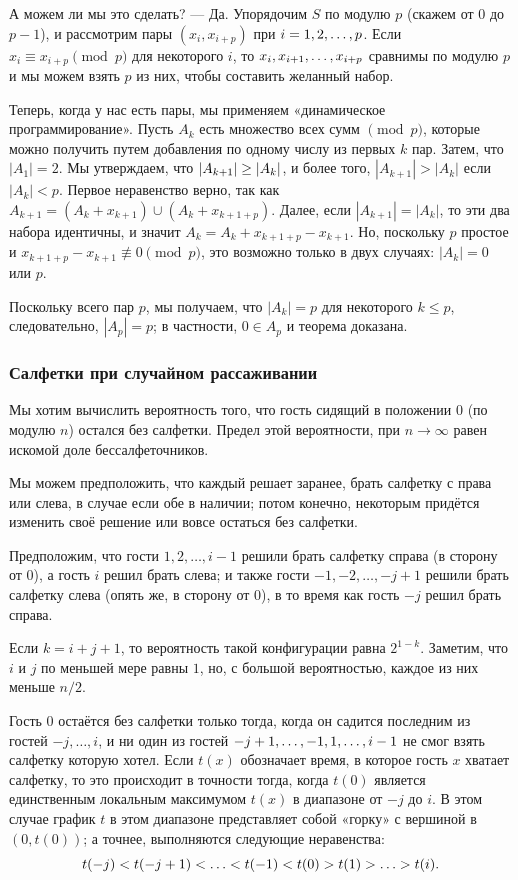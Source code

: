 А можем ли мы это сделать? --- Да.
Упорядочим $S$ по модулю $p$ (скажем от $0$ до $p-1$), и рассмотрим пары $(x_i,x_{i+p})$ при $i\z=1,2,\dots, p$.
Если $x_i\equiv x_{i+p}\pmod p$ для некоторого $i$, то $x_i,x_{i+1},\z\dots,x_{i+p}$ сравнимы по модулю $p$ и мы можем взять $p$ из них, чтобы составить желанный набор.

Теперь, когда у нас есть пары, мы применяем «динамическое программирование».
Пусть $A_k$ есть множество всех сумм $\pmod p$, которые можно получить путем добавления по одному числу из первых $k$ пар.
Затем, что $|A_1|= 2$.
Мы утверждаем, что $|A_{k+1}|\z\ge|A_k|$, и более того, $|A_{k+1}|>|A_k|$ если $|A_k|< p$.
Первое неравенство верно, так как $A_{k+1} = (A_k+x_{k+1}) \cup (A_k+x_{k+1+p})$.
Далее, если $|A_{k+1}|=|A_k|$, то эти два набора идентичны, и значит  $A_k = A_k+x_{k+1+p}-x_{k+1}$.
Но, поскольку $p$ простое и $x_{k+1+p}-x_{k+1}\not\equiv 0\pmod p$, это возможно только в двух случаях: $|A_k|= 0$ или $p$.

Поскольку всего пар $p$, мы получаем, что $|A_k|= p$ для некоторого $k \le p$, следовательно, $|A_p|= p$; в частности, $0\in A_p$ и теорема доказана. \heart

\subsubsection*{Салфетки при случайном рассаживании}

Мы хотим вычислить вероятность того, что гость сидящий в положении 0 (по модулю $n$) остался без салфетки.
Предел этой вероятности, при $n\to\infty$ равен искомой доле бессалфеточников.

Мы можем предположить, что каждый решает заранее, брать салфетку с права или слева, в случае если обе в наличии;
потом конечно, некоторым придётся изменить своё решение или вовсе остаться без салфетки.

Предположим, что гости $1,2,\dots, i - 1$ решили брать салфетку справа  (в сторону от 0), а гость $i$ решил брать слева;
и также гости $-1,-2,\dots, -j + 1$ решили брать салфетку слева (опять же, в сторону от 0), в то время как гость $-j$ решил брать справа.

Если $k = i+j+1$, то вероятность такой конфигурации равна $2^{1-k}$.
Заметим, что $i$ и $j$ по меньшей мере равны $1$, но, с большой вероятностью, каждое из них меньше $n/2$.

Гость $0$ остаётся без салфетки только тогда, когда он садится последним из гостей $-j,\dots,i$, и ни один из гостей $-j\z+1,\z\dots,-1,1,\dots,i-1$ не смог взять салфетку которую хотел.
Если $t(x)$ обозначает время, в которое гость $x$ хватает салфетку, то это происходит в точности тогда, когда $t(0)$ является единственным локальным максимумом $t(x)$ в диапазоне от $-j$ до $i$.
В этом случае график $t$ в этом диапазоне представляет собой «горку» с вершиной в $(0,t(0))$; 
а точнее, выполняются следующие неравенства: 
\[t(-j)\z<t(-j+1) \z<\z\dots\z<t(-1)\z<t(0)\z>t(1)\z>\z\dots\z>t(i).\]

